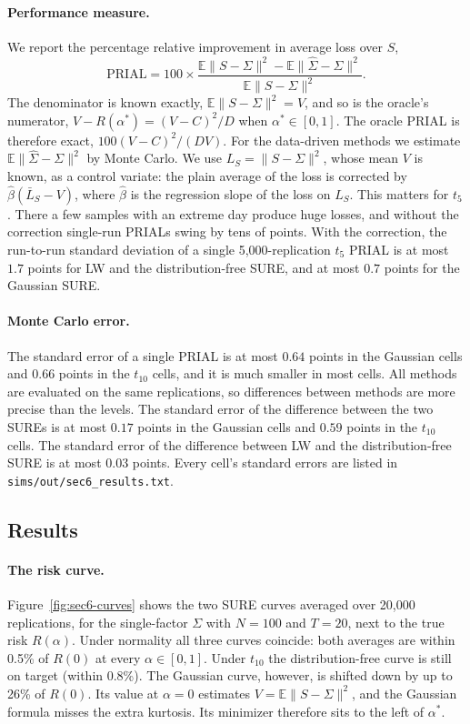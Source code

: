\paragraph{Performance measure.} We report the percentage relative improvement in average loss over $S$,
\[
  \mathrm{PRIAL} = 100 \times \frac{\mathbb{E}\|S - \Sigma\|^2 - \mathbb{E}\|\hat\Sigma - \Sigma\|^2}{\mathbb{E}\|S - \Sigma\|^2}.
\]
The denominator is known exactly, $\mathbb{E}\|S - \Sigma\|^2 = V$, and so is the oracle's numerator, $V - R(\alpha^*) = (V - C)^2/D$ when $\alpha^* \in [0,1]$. The oracle PRIAL is therefore exact, $100(V - C)^2/(DV)$. For the data-driven methods we estimate $\mathbb{E}\|\hat\Sigma - \Sigma\|^2$ by Monte Carlo. We use $L_S = \|S - \Sigma\|^2$, whose mean $V$ is known, as a control variate: the plain average of the loss is corrected by $\hat\beta(\bar L_S - V)$, where $\hat\beta$ is the regression slope of the loss on $L_S$. This matters for $t_5$. There a few samples with an extreme day produce huge losses, and without the correction single-run PRIALs swing by tens of points. With the correction, the run-to-run standard deviation of a single 5{,}000-replication $t_5$ PRIAL is at most $1.7$ points for LW and the distribution-free SURE, and at most $0.7$ points for the Gaussian SURE.

\paragraph{Monte Carlo error.} The standard error of a single PRIAL is at most $0.64$ points in the Gaussian cells and $0.66$ points in the $t_{10}$ cells, and it is much smaller in most cells. All methods are evaluated on the same replications, so differences between methods are more precise than the levels. The standard error of the difference between the two SUREs is at most $0.17$ points in the Gaussian cells and $0.59$ points in the $t_{10}$ cells. The standard error of the difference between LW and the distribution-free SURE is at most $0.03$ points. Every cell's standard errors are listed in \texttt{sims/out/sec6\_results.txt}.

\subsection{Results}

\paragraph{The risk curve.} Figure~\ref{fig:sec6-curves} shows the two SURE curves averaged over 20{,}000 replications, for the single-factor $\Sigma$ with $N = 100$ and $T = 20$, next to the true risk $R(\alpha)$. Under normality all three curves coincide: both averages are within 0.5\% of $R(0)$ at every $\alpha \in [0,1]$. Under $t_{10}$ the distribution-free curve is still on target (within 0.8\%). The Gaussian curve, however, is shifted down by up to 26\% of $R(0)$. Its value at $\alpha = 0$ estimates $V = \mathbb{E}\|S - \Sigma\|^2$, and the Gaussian formula misses the extra kurtosis. Its minimizer therefore sits to the left of $\alpha^*$.

